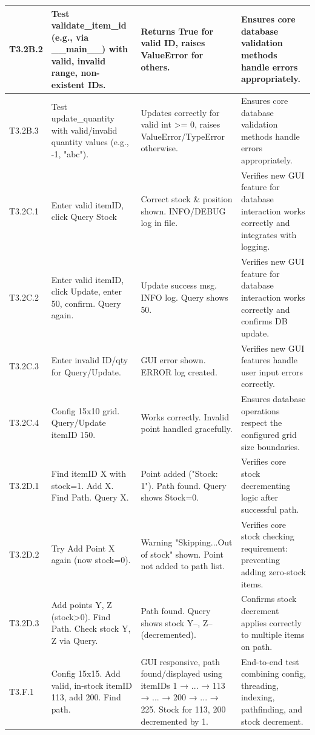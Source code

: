 \begin{longtable}{|p{}|p{}|p{}|p{}|}
	\hline
	T3.2B.2 & Test validate\_item\_id (e.g., via \_\_main\_\_) with valid, invalid range, non-existent IDs. & Returns True for valid ID, raises ValueError for others. & Ensures core database validation methods handle errors appropriately. \\
	\hline
	T3.2B.3 & Test update\_quantity with valid/invalid quantity values (e.g., -1, "abc"). & Updates correctly for valid int >= 0, raises ValueError/TypeError otherwise. & Ensures core database validation methods handle errors appropriately. \\
	\hline
	T3.2C.1 & Enter valid itemID, click Query Stock & Correct stock \& position shown. INFO/DEBUG log in file. & Verifies new GUI feature for database interaction works correctly and integrates with logging. \\
	\hline
	T3.2C.2 & Enter valid itemID, click Update, enter 50, confirm. Query again. & Update success msg. INFO log. Query shows 50. & Verifies new GUI feature for database interaction works correctly and confirms DB update. \\
	\hline
	T3.2C.3 & Enter invalid ID/qty for Query/Update. & GUI error shown. ERROR log created. & Verifies new GUI features handle user input errors correctly. \\
	\hline
	T3.2C.4 & Config 15x10 grid. Query/Update itemID 150. & Works correctly. Invalid point handled gracefully. & Ensures database operations respect the configured grid size boundaries. \\
	\hline
	T3.2D.1 & Find itemID X with stock=1. Add X. Find Path. Query X. & Point added ("Stock: 1"). Path found. Query shows Stock=0. & Verifies core stock decrementing logic after successful path. \\
	\hline
	T3.2D.2 & Try Add Point X again (now stock=0). & Warning "Skipping...Out of stock" shown. Point not added to path list. & Verifies core stock checking requirement: preventing adding zero-stock items. \\
	\hline
	T3.2D.3 & Add points Y, Z (stock>0). Find Path. Check stock Y, Z via Query. & Path found. Query shows stock Y--, Z-- (decremented). & Confirms stock decrement applies correctly to multiple items on path. \\
	\hline
	T3.F.1 & Config 15x15. Add valid, in-stock itemID 113, add 200. Find path. & GUI responsive, path found/displayed using itemIDs 1 → ... → 113 → ... → 200 → ... → 225. Stock for 113, 200 decremented by 1. & End-to-end test combining config, threading, indexing, pathfinding, and stock decrement. \\

\end{longtable}
